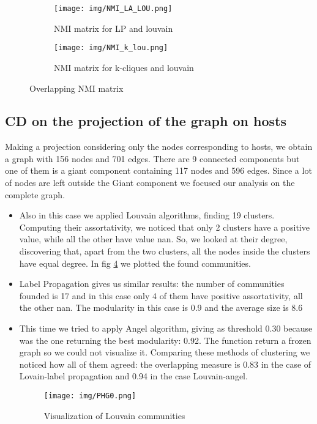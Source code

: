 \documentclass[sigchi]{acmart}
\begin{document}
\begin{figure}
     \centering
     \begin{subfigure}[b]{0.3\textwidth}
         \centering
         \texttt{[image: img/NMI\_LA\_LOU.png]}
         \caption{NMI matrix for LP and louvain}
         \label{fig:NMI_LA_LOU}
     \end{subfigure}
     \hfill
     \begin{subfigure}[b]{0.3\textwidth}
         \centering
         \texttt{[image: img/NMI\_k\_lou.png]}
         \caption{NMI matrix for k-cliques and louvain}
         \label{fig:NMI_K_LOU}
     \end{subfigure}
     \hfill
        \caption{Overlapping NMI matrix}
\end{figure}

\subsection{CD on the projection of the graph on hosts}
Making a projection considering only the nodes corresponding to hosts, we obtain a graph with 156 nodes and 701 edges. There are 9 connected components but one of them is a giant component containing 117 nodes and 596 edges. 
Since a lot of nodes are left outside the Giant component we focused our analysis on the complete graph.
\begin {itemize} 
\item Also in this case we applied Louvain algorithms, finding 19 clusters. Computing their assortativity, we noticed that only 2 clusters have a positive value, while all the other have value nan. So, we looked at their degree, discovering that, apart from the two clusters, all the nodes inside the clusters have equal degree. \newline In fig \ref{louv} we plotted the found communities.
\item Label Propagation gives us similar results: the number of communities founded is 17 and in this case only 4 of them have positive assortativity, all the other nan. The modularity in this case is 0.9 and the average size is 8.6
\item This time we tried to apply Angel algorithm, giving as threshold 0.30 because was the one returning the best modularity: 0.92. The function return a frozen graph so we could not visualize it.\newline
Comparing these methods of clustering we noticed how all of them agreed: the overlapping measure is 0.83 in the case of Lovain-label propagation and 0.94 in the case Louvain-angel.
\begin{figure}[h]
  \centering
  \texttt{[image: img/PHG0.png]}
  \caption{Visualization of Louvain communities}
  \label{louv}
\end{figure}

\end{itemize}
\end{document}
